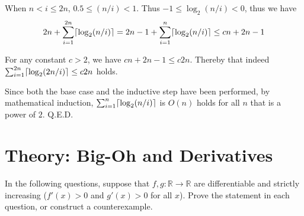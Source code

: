 \documentclass[11pt]{article}
\DeclarePairedDelimiter{\ceil}{\lceil}{\rceil}
\begin{document}
	When $n<i\leq2n$, $0.5\leq(n/i)<1$. Thus $-1\leq\log_2(n/i)<0$, thus we have
	\begin{equation*}
		2n+\sum_{i=1}^{2n}\ceil{\log_2(n/i)} = 2n-1+\sum_{i=1}^{n}\ceil{\log_2(n/i)}\leq cn+2n-1
	\end{equation*}
	
	For any constant $c>2$, we have $cn+2n-1\leq c2n$. Thereby that indeed $\sum_{i=1}^{2n} \ceil{\log_2(2n/i)}\leq c2n$ holds.
	
	Since both the base case and the inductive step have been performed, by mathematical induction, $\sum_{i=1}^{n} \ceil{\log_2(n/i)}$ is $O(n)$ holds for all $n$ that is a power of $2$. Q.E.D.
	
\section{Theory: Big-Oh and Derivatives}
	In the following questions, suppose that $f,g : \mathbb{R} \to \mathbb{R}$ are differentiable and strictly increasing ($f'(x) >0$ and $g'(x)>0$ for all $x$). Prove the statement in each question, or construct a counterexample.
\subsection{}
\end{document}
